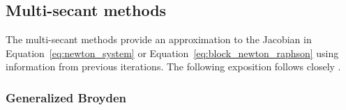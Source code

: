 
\subsection{Multi-secant methods}

The multi-secant methods provide an approximation to the Jacobian in Equation~\eqref{eq:newton_system} or Equation~\eqref{eq:block_newton_raphson} using information from previous iterations.
The following exposition follows closely \cite{fang_two_2009}.

\subsubsection{Generalized Broyden}

